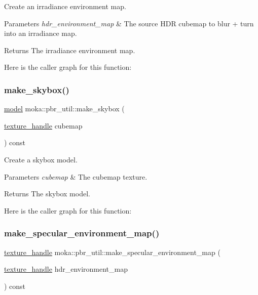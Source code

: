 Create an irradiance environment map. 


\begin{DoxyParams}{Parameters}
{\em hdr\+\_\+environment\+\_\+map} & The source H\+DR cubemap to blur + turn into an irradiance map. \\
\hline
\end{DoxyParams}
\begin{DoxyReturn}{Returns}
The irradiance environment map. 
\end{DoxyReturn}
Here is the caller graph for this function\+:
\mbox{\label{classmoka_1_1pbr__util_ae7e38f3efe0bc1b3f48e21b379d0750d}} 
\subsubsection{\texorpdfstring{make\_skybox()}{make\_skybox()}}
{\footnotesize\ttfamily \mbox{\hyperlink{classmoka_1_1model}{model}} moka\+::pbr\+\_\+util\+::make\+\_\+skybox (\begin{DoxyParamCaption}\item[{\mbox{\hyperlink{structmoka_1_1texture__handle}{texture\+\_\+handle}}}]{cubemap }\end{DoxyParamCaption}) const}



Create a skybox model. 


\begin{DoxyParams}{Parameters}
{\em cubemap} & The cubemap texture. \\
\hline
\end{DoxyParams}
\begin{DoxyReturn}{Returns}
The skybox model. 
\end{DoxyReturn}
Here is the caller graph for this function\+:
\mbox{\label{classmoka_1_1pbr__util_ac9c1b434ca30091fd08191485a8de41e}} 
\subsubsection{\texorpdfstring{make\_specular\_environment\_map()}{make\_specular\_environment\_map()}}
{\footnotesize\ttfamily \mbox{\hyperlink{structmoka_1_1texture__handle}{texture\+\_\+handle}} moka\+::pbr\+\_\+util\+::make\+\_\+specular\+\_\+environment\+\_\+map (\begin{DoxyParamCaption}\item[{\mbox{\hyperlink{structmoka_1_1texture__handle}{texture\+\_\+handle}}}]{hdr\+\_\+environment\+\_\+map }\end{DoxyParamCaption}) const}



